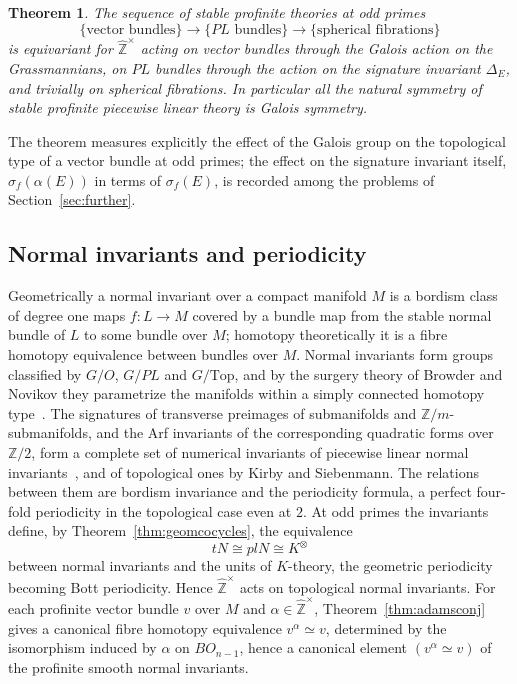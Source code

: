 \documentclass[11pt]{amsart}
\theoremstyle{plain}
\newtheorem{theorem}{Theorem}[section]
\theoremstyle{definition}
\numberwithin{equation}{section}
\newcommand{\Z}{\mathbb{Z}}
\newcommand{\Zhat}{\widehat{\mathbb{Z}}}
\newcommand{\units}{^{\times}}
\begin{document}
\begin{theorem}\label{thm:stableequivariance}
The sequence of stable profinite theories at odd primes
\[
\{\text{vector bundles}\}\to\{PL\text{ bundles}\}\to\{\text{spherical fibrations}\}
\]
is equivariant for $\Zhat\units$ acting on vector bundles through the Galois action on the Grassmannians, on $PL$ bundles through the action on the signature invariant $\Delta_E$, and trivially on spherical fibrations.
In particular all the natural symmetry of stable profinite piecewise linear theory is Galois symmetry.
\end{theorem}

The theorem measures explicitly the effect of the Galois group on the topological type of a vector bundle at odd primes; the effect on the signature invariant itself, $\sigma_f(\alpha(E))$ in terms of $\sigma_f(E)$, is recorded among the problems of Section~\ref{sec:further}.

\subsection{Normal invariants and periodicity}
Geometrically a normal invariant over a compact manifold $M$ is a bordism class of degree one maps $f\colon L\to M$ covered by a bundle map from the stable normal bundle of $L$ to some bundle over $M$; homotopy theoretically it is a fibre homotopy equivalence between bundles over $M$.
Normal invariants form groups classified by $G/O$, $G/PL$ and $G/\mathrm{Top}$, and by the surgery theory of Browder and Novikov they parametrize the manifolds within a simply connected homotopy type~\cite{Browder,Novikov,Wall}.
The signatures of transverse preimages of submanifolds and $\Z/m$-submanifolds, and the Arf invariants of the corresponding quadratic forms over $\Z/2$, form a complete set of numerical invariants of piecewise linear normal invariants~\cite{SulHaupt}, and of topological ones by Kirby and Siebenmann.
The relations between them are bordism invariance and the periodicity formula, a perfect four-fold periodicity in the topological case even at $2$.
At odd primes the invariants define, by Theorem~\ref{thm:geomcocycles}, the equivalence
\[
tN\cong plN\cong K^\otimes
\]
between normal invariants and the units of $K$-theory, the geometric periodicity becoming Bott periodicity.
Hence $\Zhat\units$ acts on topological normal invariants.
For each profinite vector bundle $v$ over $M$ and $\alpha\in\Zhat\units$, Theorem~\ref{thm:adamsconj} gives a canonical fibre homotopy equivalence $v^\alpha\simeq v$, determined by the isomorphism induced by $\alpha$ on $BO_{n-1}$, hence a canonical element $(v^\alpha\simeq v)$ of the profinite smooth normal invariants.
\end{document}

